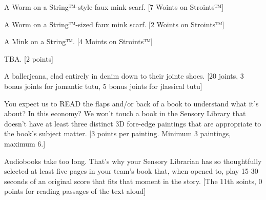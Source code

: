 \documentclass{book}
\begin{document}
\begin{list}{}{}
\item A Worm on a String™-style faux mink scarf. [7 Woints on Stroints™]
\item A Worm on a String™-sized faux mink scarf. [2 Woints on Stroints™]
\item A Mink on a String™. [4 Moints on Stroints™]
\item TBA. [2 points] %
\item A ballerjeana, clad entirely in denim down to their jointe shoes. [20 joints, 3 bonus joints for jomantic tutu, 5 bonus joints for jlassical tutu]
\item You expect us to READ the flaps and/or back of a book to understand what it’s about? In this economy? We won’t touch a book in the Sensory Library that doesn’t have at least three distinct 3D fore-edge paintings that are appropriate to the book’s subject matter. [3 points per painting. Minimum 3 paintings, maximum 6.]
\item Audiobooks take too long. That's why your Sensory Librarian has so thoughtfully selected at least five pages in your team's book that, when opened to, play 15-30 seconds of an original score that fits that moment in the story. [The 11th soints, 0 points for reading passages of the text aloud]


\end{list}
\end{document}
